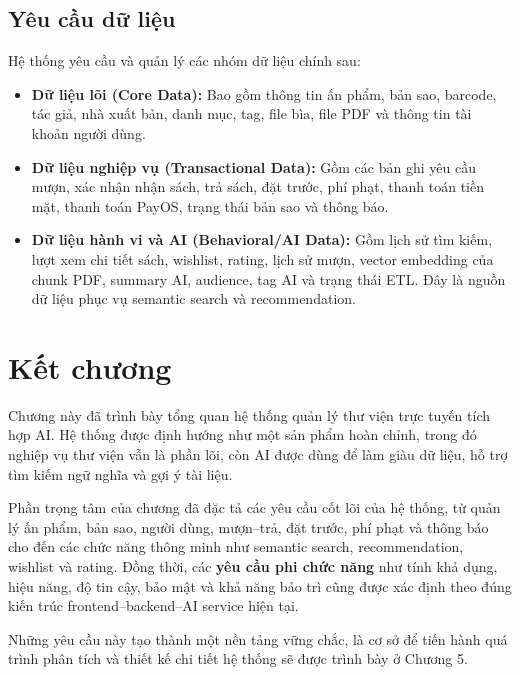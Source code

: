 \subsection{Yêu cầu dữ liệu}
\label{subsec:YeuCauDuLieu}
Hệ thống yêu cầu và quản lý các nhóm dữ liệu chính sau:
\begin{itemize}
    \item \textbf{Dữ liệu lõi (Core Data):} Bao gồm thông tin ấn phẩm, bản sao, barcode, tác giả, nhà xuất bản, danh mục, tag, file bìa, file PDF và thông tin tài khoản người dùng.

    \item \textbf{Dữ liệu nghiệp vụ (Transactional Data):} Gồm các bản ghi yêu cầu mượn, xác nhận nhận sách, trả sách, đặt trước, phí phạt, thanh toán tiền mặt, thanh toán PayOS, trạng thái bản sao và thông báo.

    \item \textbf{Dữ liệu hành vi và AI (Behavioral/AI Data):} Gồm lịch sử tìm kiếm, lượt xem chi tiết sách, wishlist, rating, lịch sử mượn, vector embedding của chunk PDF, summary AI, audience, tag AI và trạng thái ETL. Đây là nguồn dữ liệu phục vụ semantic search và recommendation.
\end{itemize}

\section{Kết chương}
\label{sec:KetChuong4}

Chương này đã trình bày tổng quan hệ thống quản lý thư viện trực tuyến tích hợp AI. Hệ thống được định hướng như một sản phẩm hoàn chỉnh, trong đó nghiệp vụ thư viện vẫn là phần lõi, còn AI được dùng để làm giàu dữ liệu, hỗ trợ tìm kiếm ngữ nghĩa và gợi ý tài liệu.

Phần trọng tâm của chương đã đặc tả các yêu cầu cốt lõi của hệ thống, từ quản lý ấn phẩm, bản sao, người dùng, mượn--trả, đặt trước, phí phạt và thông báo cho đến các chức năng thông minh như semantic search, recommendation, wishlist và rating. Đồng thời, các \textbf{yêu cầu phi chức năng} như tính khả dụng, hiệu năng, độ tin cậy, bảo mật và khả năng bảo trì cũng được xác định theo đúng kiến trúc frontend--backend--AI service hiện tại.

Những yêu cầu này tạo thành một nền tảng vững chắc, là cơ sở để tiến hành quá trình phân tích và thiết kế chi tiết hệ thống sẽ được trình bày ở Chương 5.
